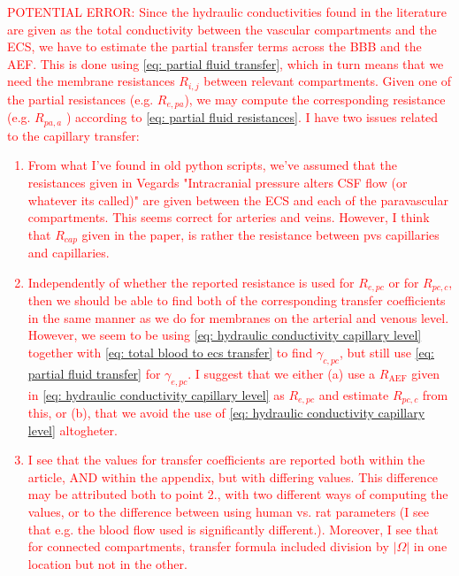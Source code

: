 \documentclass{article}
\theoremstyle{definition}
\theoremstyle{plain}
\theoremstyle{remark}
\newcommand{\ISSUE}[1]{\textcolor{red}{POTENTIAL ERROR: #1}}
\begin{document}
\ISSUE{
    Since the hydraulic conductivities found in the literature are given as the total conductivity between the vascular compartments and the ECS, we have to estimate the partial transfer terms across the BBB and the AEF. This is done using \eqref{eq: partial fluid transfer}, which in turn means that we need the membrane resistances \( R_{i, j} \) between relevant compartments. Given one of the partial resistances (e.g. \( R_{e, pa} \)), we may compute the corresponding resistance (e.g.  \( R_{pa, a}\) ) according to \eqref{eq: partial fluid resistances}. I have two issues related to the capillary transfer:
    \begin{enumerate}
        \item From what I've found in old python scripts, we've assumed that the resistances given in Vegards "Intracranial pressure alters CSF flow (or whatever its called)"  are given between the ECS and each of the paravascular compartments. This seems correct for arteries and veins. However, I think that \( R_{cap} \) given in the paper, is rather the resistance between pvs capillaries and capillaries.
        \item Independently of whether the reported resistance is used for \( R_{e, pc} \) or for \( R_{pc, c} \), then we should be able to find both of the corresponding transfer coefficients in the same manner as we do for membranes on the arterial and venous level. However, we seem to be using \eqref{eq: hydraulic conductivity capillary level} together with \eqref{eq: total blood to ecs transfer}  to find \( \gamma_{c, pc} \), but still use \eqref{eq: partial fluid transfer} for \( \gamma_{e, pc} \). I suggest that we either (a) use a \( R_{\text{AEF}} \) given in \eqref{eq: hydraulic conductivity capillary level} as \( R_{e, pc} \) and estimate \( R_{pc, c} \) from this, or (b), that we avoid the use of \eqref{eq: hydraulic conductivity capillary level} altogheter.
        \item I see that the values for transfer coefficients are reported both within the article, AND within the appendix, but with differing values. This difference may be attributed both to point 2., with two different ways of computing the values, or to the difference between using human vs. rat parameters (I see that e.g. the blood flow used is significantly different.). Moreover, I see that for connected compartments, transfer formula included division by \( \lvert \Omega \rvert \) in one location but not in the other.
\end{enumerate}}
\end{document}
